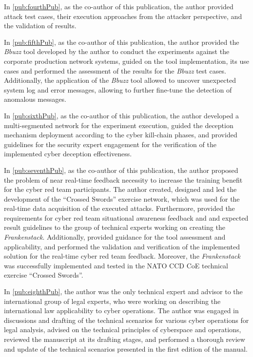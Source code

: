 \begin{contriblist}
\item In \ref{pub:fourthPub}, as the co-author of this publication, the author provided attack test cases, their execution approaches from the attacker perspective, and the validation of results.
\item In \ref{pub:fifthPub}, as the co-author of this publication, the author provided the \textit{Bbuzz} tool developed by the author to conduct the experiments against the corporate production network systems, guided on the tool implementation, its use cases and performed the assessment of the results for the \textit{Bbuzz} test cases. Additionally, the application of the \textit{Bbuzz} tool allowed to uncover unexpected system log and error messages, allowing to further fine-tune the detection of anomalous messages.
\item In \ref{pub:sixthPub}, as the co-author of this publication, the author developed a multi-segmented network for the experiment execution, guided the deception mechanism deployment according to the cyber kill-chain phases, and provided guidelines for the security expert engagement for the verification of the implemented cyber deception effectiveness.
\item In \ref{pub:seventhPub}, as the co-author of this publication, the author proposed the problem of near real-time feedback necessity to increase the training benefit for the cyber red team participants. The author created, designed and led the development of the ``Crossed Swords'' exercise network, which was used for the real-time data acquisition of the executed attacks. Furthermore, provided the requirements for cyber red team situational awareness feedback and and expected result guidelines to the group of technical experts working on creating the \textit{Frankenstack}. Additionally, provided guidance for the tool assessment and applicability, and performed the validation and verification of the implemented solution for the real-time cyber red team feedback. Moreover, the \textit{Frankenstack} was successfully implemented and tested in the NATO CCD CoE technical exercise ``Crossed Swords''.
\item In \ref{pub:eighthPub}, the author was the only technical expert and advisor to the international group of legal experts, who were working on describing the international law applicability to cyber operations. The author was engaged in discussions and drafting of the technical scenarios for various cyber operations for legal analysis, advised on the technical principles of cyberspace and operations, reviewed the manuscript at its drafting stages, and performed a thorough review and update of the technical scenarios presented in the first edition of the manual.

\end{contriblist}

